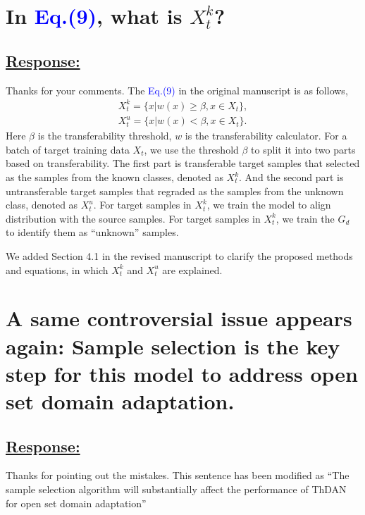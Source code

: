 \section{In \textcolor{blue}{Eq.(9)}, what is  $X_t^k$?}
\subsection*{\underline{\textbf{Response:}}}

Thanks for your comments.
The \textcolor{blue}{Eq.(9)} in the original manuscript is as follows,
\begin{equation}
    \label{eq: split target examples}
    \begin{split}
        X_t^k=\{x|w(x) \geq \beta, x \in X_t \}, \\
        X_t^u=\{x|w(x) < \beta, x \in X_t \}.
    \end{split}
\end{equation}
Here $\beta$ is the transferability threshold, $w$ is the transferability calculator.
For a batch of target training data $X_t$, we use the threshold $\beta$ to split it into two parts based on transferability.
The first part is transferable target samples that selected as the samples from the known classes, denoted as $X_t^k$.
And the second part is untransferable target samples that regraded as the samples from the unknown class, denoted as $X_t^u$.
For target samples in $X_t^k$, we train the model to align distribution with the source samples.
For target samples in $X_t^k$, we train the $G_d$ to identify them as ``unknown'' samples.

We added Section 4.1 in the revised manuscript to clarify the proposed methods and equations, in which $X_t^k$ and $X_t^u$ are explained.

\section{A same controversial issue appears again: Sample selection is the key step for this model to address open set domain adaptation.}
\subsection*{\underline{\textbf{Response:}}}

Thanks for pointing out the mistakes.
This sentence has been modified as ``The sample selection algorithm will substantially affect the performance of ThDAN for open set domain adaptation'' 

